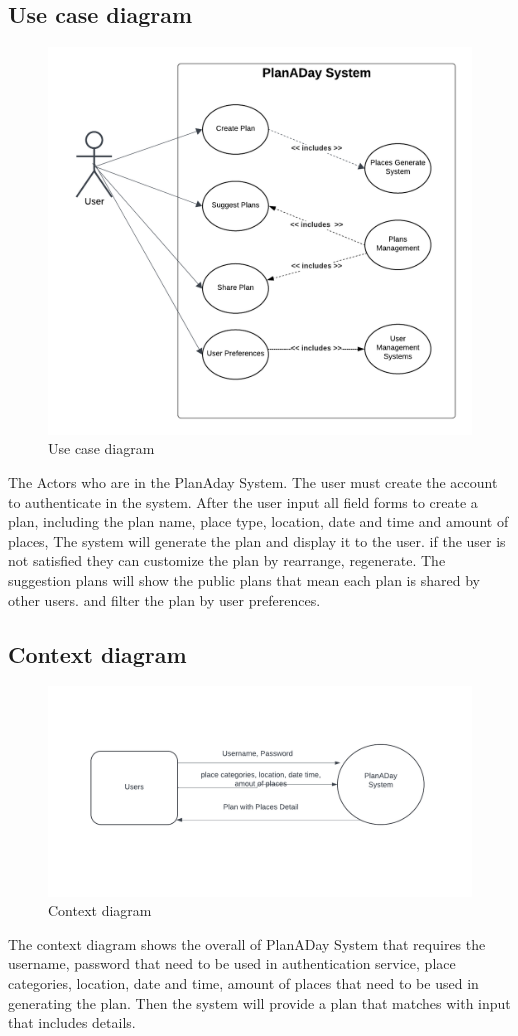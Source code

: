 \subsection{Use case diagram}
\begin{figure}[!h]
    \centering
    \includegraphics[width=0.7\linewidth]{chapter3/use-case-diagram.png}
    \caption{Use case diagram}
    \label{fig:Use case diagram}
\end{figure}
\par
The Actors who are in the PlanAday System. The user must create the account to authenticate in
the system. After the user input all field forms to create a plan, including the plan name, place
type, location, date and time and amount of places, The system will generate the plan and
display it to the user. if the user is not satisfied they can customize the plan by rearrange,
regenerate. The suggestion plans will show the public plans that mean each plan is shared by
other users. and filter the plan by user preferences.

\newpage
\subsection{Context diagram}
\begin{figure}[!h]
    \centering
    \includegraphics[width=1\linewidth]{chapter3/context-diagram.png}
    \caption{Context diagram}
    \label{fig:Context diagram}
\end{figure}
\par
The context diagram shows the overall of PlanADay System that requires the username,
password that need to be used in authentication service, place categories, location, date and time,
amount of places that need to be used in generating the plan. Then the system will provide a plan
that matches with input that includes details.

